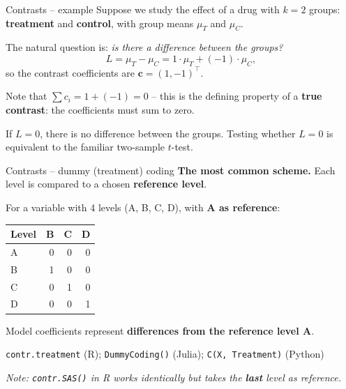 \documentclass[10pt,ignorenonframetext,aspectratio=169]{beamer}
\begin{document}
\begin{frame}{Contrasts -- example}
Suppose we study the effect of a drug with $k = 2$ groups: 
\textbf{treatment} and \textbf{control}, with group means $\mu_T$ and $\mu_C$.

\medskip
The natural question is: \textit{is there a difference between the groups?}
\begin{equation}
    L = \mu_T - \mu_C = 1 \cdot \mu_T + (-1) \cdot \mu_C,
\end{equation}
so the contrast coefficients are $\boldsymbol{c} = (1, -1)^{\top}$.

\medskip
Note that $\sum c_i = 1 + (-1) = 0$ -- this is the defining property of a 
\textbf{true contrast}: the coefficients must sum to zero.

\medskip
If $L = 0$, there is no difference between the groups. Testing whether $L = 0$ 
is equivalent to the familiar two-sample $t$-test.
\end{frame}



\begin{frame}{Contrasts -- dummy (treatment) coding}
\textbf{The most common scheme.} Each level is compared to a chosen \textbf{reference level}.

\smallskip
For a variable with 4 levels (A, B, C, D), with \textbf{A as reference}:

\begin{table}[ht]
\centering
\begin{tabular}{lrrr}
  \hline
  Level & B & C & D \\
  \hline
  A & 0 & 0 & 0 \\
  B & 1 & 0 & 0 \\
  C & 0 & 1 & 0 \\
  D & 0 & 0 & 1 \\
  \hline
\end{tabular}
\end{table}

Model coefficients represent \textbf{differences from the reference level A}.

\smallskip
\texttt{contr.treatment} (R); \texttt{DummyCoding()} (Julia); \texttt{C(X, Treatment)} (Python)

\smallskip
\textit{Note: \texttt{contr.SAS()} in R works identically but takes the \textbf{last} level as reference.}
\end{frame}
\end{document}
